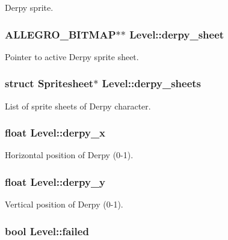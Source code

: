 \-Derpy sprite. \hypertarget{structLevel_a0e02f3a5674a2ad3c23de22b6a4ed044}{
\subsubsection[{derpy\-\_\-sheet}]{\setlength{\rightskip}{0pt plus 5cm}\-A\-L\-L\-E\-G\-R\-O\-\_\-\-B\-I\-T\-M\-A\-P$\ast$$\ast$ {\bf \-Level\-::derpy\-\_\-sheet}}}\label{structLevel_a0e02f3a5674a2ad3c23de22b6a4ed044}
\-Pointer to active \-Derpy sprite sheet. \hypertarget{structLevel_aad19c0af5ac43ceb72df311d89bd4297}{
\subsubsection[{derpy\-\_\-sheets}]{\setlength{\rightskip}{0pt plus 5cm}struct {\bf \-Spritesheet}$\ast$ {\bf \-Level\-::derpy\-\_\-sheets}}}\label{structLevel_aad19c0af5ac43ceb72df311d89bd4297}
\-List of sprite sheets of \-Derpy character. \hypertarget{structLevel_ae5a97d5b61c70c63e93992a9ff3935f9}{
\subsubsection[{derpy\-\_\-x}]{\setlength{\rightskip}{0pt plus 5cm}float {\bf \-Level\-::derpy\-\_\-x}}}\label{structLevel_ae5a97d5b61c70c63e93992a9ff3935f9}
\-Horizontal position of \-Derpy (0-\/1). \hypertarget{structLevel_a7b3c0f5af134797a1ed21ef48da3ab00}{
\subsubsection[{derpy\-\_\-y}]{\setlength{\rightskip}{0pt plus 5cm}float {\bf \-Level\-::derpy\-\_\-y}}}\label{structLevel_a7b3c0f5af134797a1ed21ef48da3ab00}
\-Vertical position of \-Derpy (0-\/1). \hypertarget{structLevel_a5bea34b31777260f1b23a1d64e6cd865}{
\subsubsection[{failed}]{\setlength{\rightskip}{0pt plus 5cm}bool {\bf \-Level\-::failed}}}\label{structLevel_a5bea34b31777260f1b23a1d64e6cd865}
